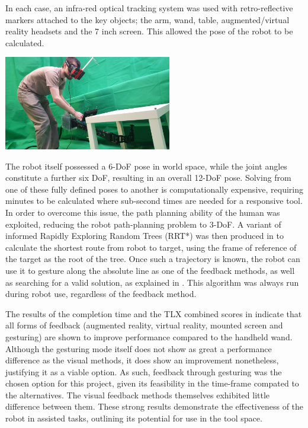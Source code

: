 \documentclass[11pt]{article}
\begin{document}
In each case, an infra-red optical tracking system was used with retro-reflective markers attached to the key objects; the arm, wand, table, augmented/virtual reality headsets and the 7 inch screen. This allowed the pose of the robot to be calculated.

\begin{center}
\includegraphics[width=0.55\textwidth]{vrrobot.png}
\label{figure:vrrobot}
\end{center} 
 
The robot itself possessed a 6-DoF pose in world space, while the joint angles constitute a further six DoF, resulting in an overall 12-DoF pose. Solving from one of these fully defined poses to another is computationally expensive, requiring minutes to be calculated where sub-second times are needed for a responsive tool. In order to overcome this issue, the path planning ability of the human was exploited, reducing the robot path-planning problem to 3-DoF. A variant of informed Rapidly Exploring Random Trees (RRT*) \cite{Gammell2014} was then produced in \cite{GreggSmithFeedback} to calculate the shortest route from robot to target, using the frame of reference of the target as the root of the tree. Once such a trajectory is known, the robot can use it to gesture along the absolute line as one of the feedback methods, as well as searching for a valid solution, as explained in \cite{GreggSmithKinematics}. This algorithm was always run during robot use, regardless of the feedback method.

The results of the completion time and the TLX combined scores in \cite{GreggSmithFeedback} indicate that all forms of feedback (augmented reality, virtual reality, mounted screen and gesturing) are shown to improve performance compared to the handheld wand. Although the gesturing mode itself does not show as great a performance difference as the visual methods, it does show an improvement nonetheless, justifying it as a viable option. As such, feedback through gesturing was the chosen option for this project, given its feasibility in the time-frame compated to the alternatives. The visual feedback methods themselves exhibited little difference between them. These strong results demonstrate the effectiveness of the robot in assisted tasks, outlining its potential for use in the tool space.
	
\end{document}
